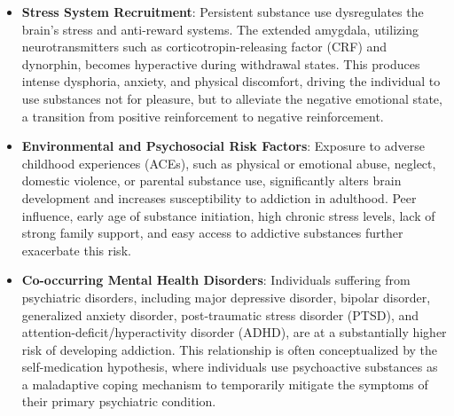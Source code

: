 \begin{itemize}
    \item \textbf{Stress System Recruitment}: Persistent substance use dysregulates the brain's stress and anti-reward systems. The extended amygdala, utilizing neurotransmitters such as corticotropin-releasing factor (CRF) and dynorphin, becomes hyperactive during withdrawal states. This produces intense dysphoria, anxiety, and physical discomfort, driving the individual to use substances not for pleasure, but to alleviate the negative emotional state, a transition from positive reinforcement to negative reinforcement.
    \item \textbf{Environmental and Psychosocial Risk Factors}: Exposure to adverse childhood experiences (ACEs), such as physical or emotional abuse, neglect, domestic violence, or parental substance use, significantly alters brain development and increases susceptibility to addiction in adulthood. Peer influence, early age of substance initiation, high chronic stress levels, lack of strong family support, and easy access to addictive substances further exacerbate this risk.
    \item \textbf{Co-occurring Mental Health Disorders}: Individuals suffering from psychiatric disorders, including major depressive disorder, bipolar disorder, generalized anxiety disorder, post-traumatic stress disorder (PTSD), and attention-deficit/hyperactivity disorder (ADHD), are at a substantially higher risk of developing addiction. This relationship is often conceptualized by the self-medication hypothesis, where individuals use psychoactive substances as a maladaptive coping mechanism to temporarily mitigate the symptoms of their primary psychiatric condition.
\end{itemize}

